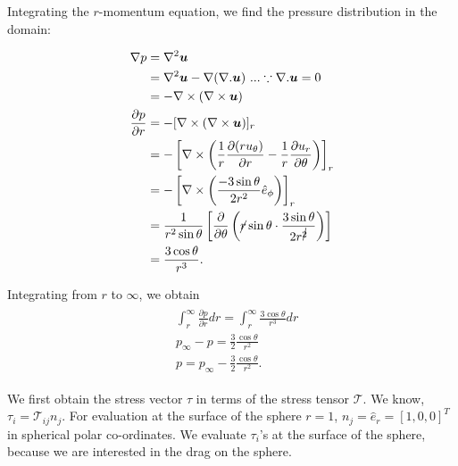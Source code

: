\documentclass{article}
\begin{document}
Integrating the $r$-momentum equation, we find the pressure distribution in the domain:

\begin{align}\label{eq:r_mom}
 \begin{split}
  \nabla p &= \nabla^{2} \boldsymbol{u}\\
  &= \nabla^{2} \boldsymbol{u} - \nabla(\nabla.\boldsymbol{u}) \textrm{ ...} \because \nabla.\boldsymbol{u} = 0\\
  &= -\nabla \times (\nabla \times \boldsymbol{u})\\
  \frac{\partial p}{\partial r} &= -[\nabla \times (\nabla \times \boldsymbol{u})]_{r}\\
  &= -\left[\nabla \times \left(\frac{1}{r} \frac{\partial (r u_{\theta})}{\partial r} - \frac{1}{r}\frac{\partial u_{r}}{\partial \theta}\right) \right]_{r}\\
  &= -\left[\nabla \times \left(\frac{-3\sin{\theta}}{2r^{2}} \hat{e}_{\phi}\right)\right]_{r} \\
  &= \frac{1}{r^{2}\sin{\theta}} \left[\frac{\partial }{\partial \theta}\left(\cancel{r} \sin{\theta} \cdot \frac{3\sin{\theta}}{2r^{\cancel{2} }}  \right) \right]\\
  & = \frac{3\cos{\theta}}{r^{3}}.
 \end{split} 
\end{align}

Integrating from $r$ to $\infty$, we obtain
\begin{align}\label{eq:get_p}
 \begin{split}
  &\int_{r}^{\infty}\frac{\partial p}{\partial r} dr  = \int_{r}^{\infty}\frac{3\cos{\theta}}{r^{3}} dr\\
  & p_{\infty} - p = \frac{3}{2}\frac{\cos{\theta}}{r^{2}}\\
  & \boxed{p = p_{\infty} - \frac{3}{2}\frac{\cos{\theta}}{r^{2}} }.
 \end{split}
\end{align}

We first obtain the stress vector $\tau$ in terms of the stress tensor $\mathcal{T}$. We know, $\tau_{i} = \mathcal{T}_{ij} n_{j}$. For evaluation at the surface of the sphere $r=1$, $n_{j} = \hat{e}_{r} = [1, 0, 0]^{T}$ in spherical polar co-ordinates. We evaluate $\tau_{i}$'s at the surface of the sphere, because we are interested in the drag on the sphere.
\end{document}
